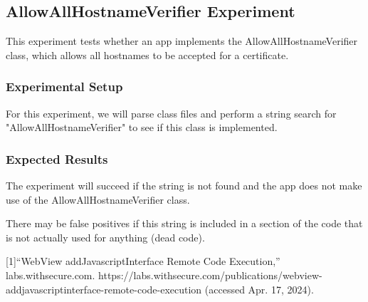 \documentclass[10pt,twocolumn,pdftex]{article}
\begin{document}
    
\subsection{AllowAllHostnameVerifier Experiment}
    This experiment tests whether an app implements the AllowAllHostnameVerifier class, which allows all hostnames to be accepted for a certificate.
    
    \subsubsection{Experimental Setup}
    For this experiment, we will parse class files and perform a string search for "AllowAllHostnameVerifier" to see if this class is implemented.
    
    \subsubsection{Expected Results}
    The experiment will succeed if the string is not found and the app does not make use of the AllowAllHostnameVerifier class.
    
    There may be false positives if this string is included in a section of the code that is not actually used for anything (dead code).



[1]“WebView addJavascriptInterface Remote Code Execution,” labs.withsecure.com. https://labs.withsecure.com/publications/webview-addjavascriptinterface-remote-code-execution (accessed Apr. 17, 2024).
‌
\end{document}
